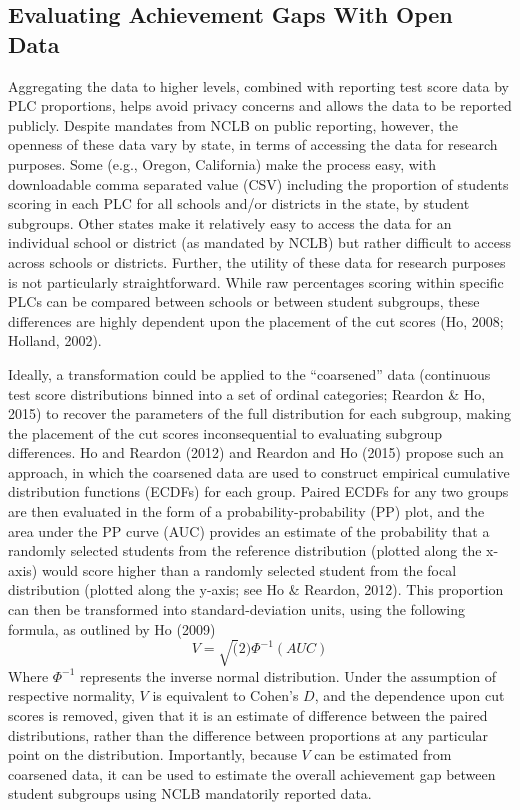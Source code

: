 \documentclass[man, fleqn, noextraspace]{apa6}
\theoremstyle{definition}
\theoremstyle{definition}
\theoremstyle{definition}
\theoremstyle{remark}
\begin{document}
\hypertarget{evaluating-achievement-gaps-with-open-data}{%
\subsection{Evaluating Achievement Gaps With Open
Data}\label{evaluating-achievement-gaps-with-open-data}}

Aggregating the data to higher levels, combined with reporting test
score data by PLC proportions, helps avoid privacy concerns and allows
the data to be reported publicly. Despite mandates from NCLB on public
reporting, however, the openness of these data vary by state, in terms
of accessing the data for research purposes. Some (e.g., Oregon,
California) make the process easy, with downloadable comma separated
value (CSV) including the proportion of students scoring in each PLC for
all schools and/or districts in the state, by student subgroups. Other
states make it relatively easy to access the data for an individual
school or district (as mandated by NCLB) but rather difficult to access
across schools or districts. Further, the utility of these data for
research purposes is not particularly straightforward. While raw
percentages scoring within specific PLCs can be compared between schools
or between student subgroups, these differences are highly dependent
upon the placement of the cut scores (Ho, 2008; Holland, 2002).

Ideally, a transformation could be applied to the \enquote{coarsened}
data (continuous test score distributions binned into a set of ordinal
categories; Reardon \& Ho, 2015) to recover the parameters of the full
distribution for each subgroup, making the placement of the cut scores
inconsequential to evaluating subgroup differences. Ho and Reardon
(2012) and Reardon and Ho (2015) propose such an approach, in which the
coarsened data are used to construct empirical cumulative distribution
functions (ECDFs) for each group. Paired ECDFs for any two groups are
then evaluated in the form of a probability-probability (PP) plot, and
the area under the PP curve (AUC) provides an estimate of the
probability that a randomly selected students from the reference
distribution (plotted along the x-axis) would score higher than a
randomly selected student from the focal distribution (plotted along the
y-axis; see Ho \& Reardon, 2012). This proportion can then be
transformed into standard-deviation units, using the following formula,
as outlined by Ho (2009) \begin{equation}
V = \sqrt(2)\Phi^{-1}(AUC)
\end{equation} Where \(\Phi^{-1}\) represents the inverse normal
distribution. Under the assumption of respective normality, \(V\) is
equivalent to Cohen's \(D\), and the dependence upon cut scores is
removed, given that it is an estimate of difference between the paired
distributions, rather than the difference between proportions at any
particular point on the distribution. Importantly, because \(V\) can be
estimated from coarsened data, it can be used to estimate the overall
achievement gap between student subgroups using NCLB mandatorily
reported data.
\end{document}
